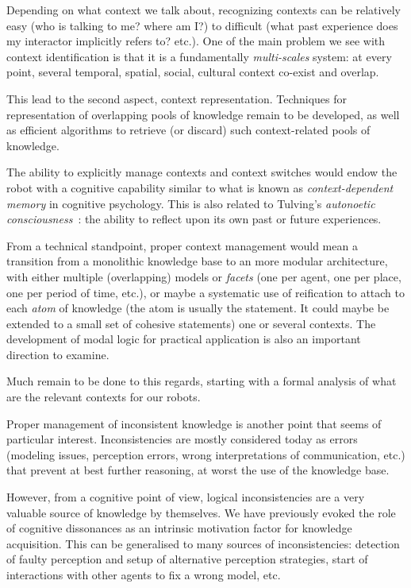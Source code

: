 Depending on what context we talk about, recognizing contexts can be relatively
easy (who is talking to me? where am I?) to difficult (what past experience
does my interactor implicitly refers to? etc.). One of the main problem we see
with context identification is that it is a fundamentally \emph{multi-scales}
system: at every point, several temporal, spatial, social, cultural context
co-exist and overlap.

This lead to the second aspect, context representation. Techniques for
representation of overlapping pools of knowledge remain to be developed, as
well as efficient algorithms to retrieve (or discard) such context-related
pools of knowledge.

The ability to explicitly manage contexts and context switches would endow the
robot with a cognitive capability similar to what is known as
\emph{context-dependent memory} in cognitive psychology. This is also related to
Tulving's \emph{autonoetic consciousness}~\cite{Tulving1985a}: the ability to
reflect upon its own past or future experiences.

From a technical standpoint, proper context management would mean a transition
from a monolithic knowledge base to an more modular architecture, with either
multiple (overlapping) models or \emph{facets} (one per agent, one per place,
one per period of time, etc.), or maybe a systematic use of reification to
attach to each \emph{atom} of knowledge (the atom is usually the statement. It
could maybe be extended to a small set of cohesive statements) one or several
contexts. The development of modal logic for practical application is also an
important direction to examine.

Much remain to be done to this regards, starting with a formal analysis of what
are the relevant contexts for our robots.

\par

Proper management of inconsistent knowledge is another point that seems of
particular interest. Inconsistencies are mostly considered today as errors
(modeling issues, perception errors, wrong interpretations of communication, etc.)
that prevent at best further reasoning, at worst the use of the knowledge base.

However, from a cognitive point of view, logical inconsistencies are a very
valuable source of knowledge by themselves. We have previously evoked the role
of cognitive dissonances as an intrinsic motivation factor for knowledge
acquisition. This can be generalised to many sources of inconsistencies:
detection of faulty perception and setup of alternative perception strategies,
start of interactions with other agents to fix a wrong model, etc.

